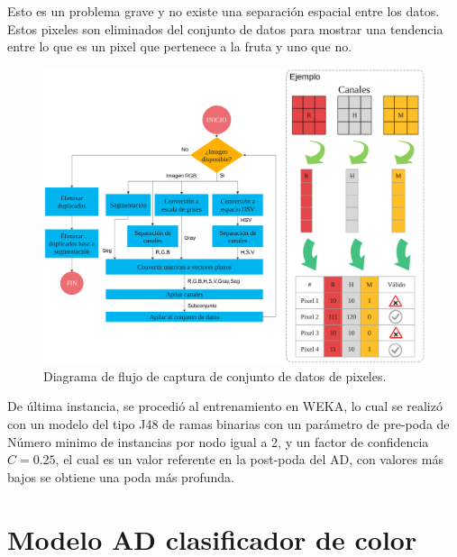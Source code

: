 \documentclass[twoside,spanish,ESP,MSc]{plantillaLabUPV}
\theoremstyle{definition}
\begin{document}

Esto es un problema grave y no existe una separación espacial entre los datos. Estos pixeles son eliminados del conjunto de datos para mostrar una tendencia entre lo que es un pixel que pertenece a la fruta y uno que no.


\begin{figure}
	\centering
	\includegraphics[width=0.9\linewidth]{edrawimas/dscolor2}
	\caption{Diagrama de flujo de captura de conjunto de datos de pixeles.}
	\label{fig:dspixes}
\end{figure}

De última instancia, se procedió al entrenamiento en WEKA, lo cual se realizó con un modelo del tipo J48 de ramas binarias con un parámetro de pre-poda de Número minimo de instancias por nodo igual a 2, y un factor de confidencia $C=0.25$, el cual es un valor referente en la post-poda del AD, con valores más bajos se obtiene una poda más profunda.


\section{Modelo AD clasificador de color} \label{sec:classcol}
\end{document}
